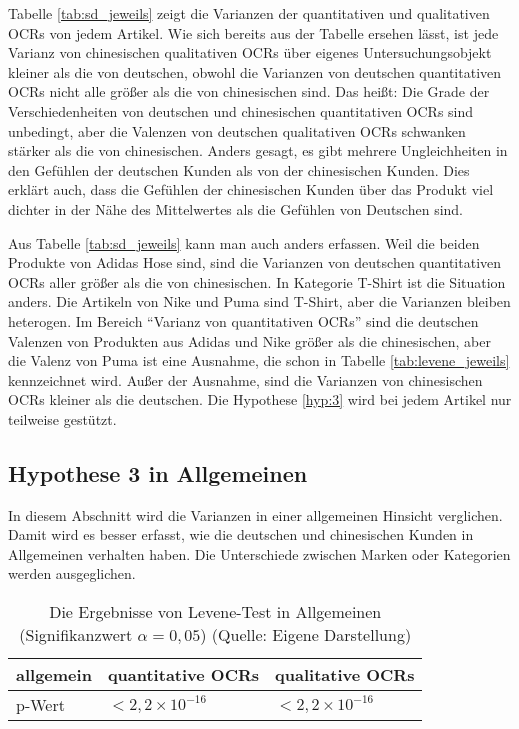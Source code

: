Tabelle \ref{tab:sd_jeweils} zeigt die Varianzen der quantitativen und qualitativen \ac{OCRs} von jedem Artikel. Wie sich bereits aus der Tabelle ersehen lässt, ist jede Varianz von chinesischen qualitativen \ac{OCRs} über eigenes Untersuchungsobjekt kleiner als die von deutschen, obwohl die Varianzen von deutschen quantitativen \ac{OCRs} nicht alle größer als die von chinesischen sind. Das heißt: Die Grade der Verschiedenheiten von deutschen und chinesischen quantitativen \ac{OCRs} sind unbedingt, aber die Valenzen von deutschen qualitativen \ac{OCRs} schwanken stärker als die von chinesischen. Anders gesagt, es gibt mehrere Ungleichheiten in den Gefühlen der deutschen Kunden als von der chinesischen Kunden. Dies erklärt auch, dass die Gefühlen der chinesischen Kunden über das Produkt viel dichter in der Nähe des Mittelwertes als die Gefühlen von Deutschen sind.

Aus Tabelle \ref{tab:sd_jeweils} kann man auch anders erfassen. Weil die beiden Produkte von Adidas Hose sind, sind die Varianzen von deutschen quantitativen \ac{OCRs} aller größer als die von chinesischen. In Kategorie T-Shirt ist die Situation anders. Die Artikeln von Nike und Puma sind T-Shirt, aber die Varianzen bleiben heterogen. Im Bereich ``Varianz von quantitativen \ac{OCRs}'' sind die deutschen Valenzen von Produkten aus Adidas und Nike größer als die chinesischen, aber die Valenz von Puma ist eine Ausnahme, die schon in Tabelle \ref{tab:levene_jeweils} kennzeichnet wird. Außer der Ausnahme, sind die Varianzen von chinesischen \ac{OCRs} kleiner als die deutschen. Die Hypothese \ref{hyp:3} wird bei jedem Artikel nur teilweise gestützt. 
\subsection{Hypothese 3 in Allgemeinen}
In diesem Abschnitt wird die Varianzen in einer allgemeinen Hinsicht verglichen. Damit wird es besser erfasst, wie die deutschen und chinesischen Kunden in Allgemeinen verhalten haben. Die Unterschiede zwischen Marken oder Kategorien werden ausgeglichen.

\begin{table}[htb]
\centering
\begin{tabular}{|l|l|l|}
\hline
allgemein & quantitative \ac{OCRs} & qualitative \ac{OCRs}  \\ \hline
p-Wert    & $< 2,2 \times 10^{-16}$ & $< 2,2 \times 10^{-16}$  \\ \hline
\end{tabular}
\caption[Die Ergebnisse von Levene-Test in Allgemeinen]{Die Ergebnisse von Levene-Test in Allgemeinen (Signifikanzwert $\alpha = 0,05$) (Quelle: Eigene Darstellung)}
\label{tab:levene_allgemein}
\end{table}

